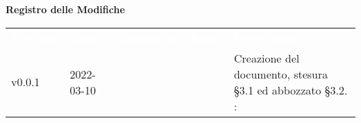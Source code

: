 

{\LARGE{\textbf{Registro delle Modifiche}}} \\
\begin{table}[!htbp]
\renewcommand{\arraystretch}{1.5}
\begin{tabular}{ m{}<{\centering}  m{}<{\centering}  m{}<{\centering}  m{}<{\centering}  m{}<{\centering} }
	\rowcolor{darkblue}
	\textcolor{white}{\textbf{Versione}} &\textcolor{white}{\textbf{Data}}& \textcolor{white}{\textbf{Nominativo}} & \textcolor{white}{\textbf{Ruolo}}&\textcolor{white}{\textbf{Descrizione}}\\ 



	v0.0.1& 2022-03-10 & \GC &\AN & Creazione del documento, stesura \S{}3.1 ed abbozzato \S{}3.2. \VE: \textit{}\\

\end{tabular}
\end{table}

\pagebreak